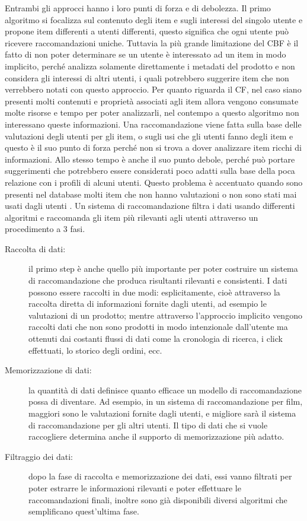 Entrambi gli approcci hanno i loro punti di forza e di debolezza. Il primo algoritmo si focalizza sul contenuto degli item e
sugli interessi del singolo utente e propone item differenti a utenti differenti, questo significa che ogni utente può ricevere 
raccomandazioni uniche. 
Tuttavia la più grande limitazione del CBF è il fatto di non poter determinare se un utente è interessato ad un item in modo implicito,
perché analizza solamente direttamente i metadati del prodotto e non considera gli interessi di altri utenti, i quali potrebbero 
suggerire item che non verrebbero notati con questo approccio.
Per quanto riguarda il CF, nel caso siano presenti molti contenuti e proprietà associati agli item allora vengono consumate molte 
risorse e tempo per poter analizzarli, nel contempo a questo algoritmo non interessano queste informazioni. Una raccomandazione 
viene fatta sulla base delle valutazioni degli utenti per gli item, o sugli usi che gli utenti fanno degli item e questo è il suo punto 
di forza perché non si trova a dover analizzare item ricchi di informazioni. Allo stesso tempo è anche il suo punto debole, perché può
portare suggerimenti che potrebbero essere considerati poco adatti sulla base della poca relazione con i profili di alcuni utenti. 
Questo problema è accentuato quando sono presenti nel database molti item che non hanno valutazioni o non sono stati mai usati dagli 
utenti \cite{model-based-approach-for-collaborative-filtering}.
\vspace{0.5 cm}
\hfill\break
Un sistema di raccomandazione filtra i dati usando differenti algoritmi e raccomanda gli item più rilevanti agli utenti attraverso 
un procedimento a 3 fasi.
\begin{description}
    \item[Raccolta di dati:] il primo step è anche quello più importante per poter costruire un sistema di 
    raccomandazione che produca risultanti rilevanti e consistenti. I dati possono essere raccolti in due modi: esplicitamente, 
    cioè attraverso la raccolta diretta di informazioni fornite dagli utenti, ad esempio le valutazioni di un prodotto; mentre 
    attraverso l'approccio implicito vengono raccolti dati che non sono prodotti in modo intenzionale dall'utente ma ottenuti 
    dai costanti flussi di dati come la cronologia di ricerca, i click effettuati, lo storico degli ordini, ecc.
    \item[Memorizzazione di dati:] la quantità di dati definisce quanto efficace un modello di raccomandazione possa di 
    diventare. Ad esempio, in un sistema di raccomandazione per film, maggiori sono le valutazioni fornite dagli utenti, e 
    migliore sarà il sistema di raccomandazione per gli altri utenti. Il tipo di dati che si vuole raccogliere determina
    anche il supporto di memorizzazione più adatto.
    \item[Filtraggio dei dati:] dopo la fase di raccolta e memorizzazione dei dati, essi vanno filtrati per poter estrarre 
    le informazioni rilevanti e poter effettuare le raccomandazioni finali, inoltre sono già disponibili diversi algoritmi che 
    semplificano quest'ultima fase.
\end{description}
